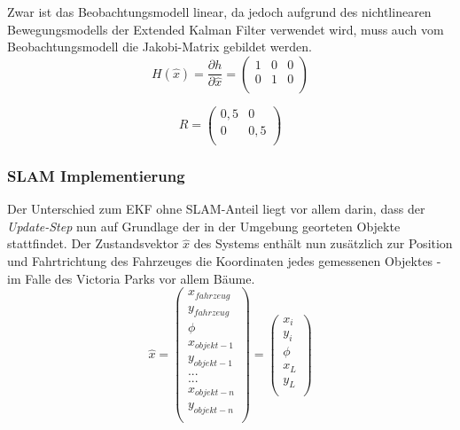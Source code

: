 \documentclass[11pt]{article}
\begin{document}
Zwar ist das Beobachtungsmodell linear, da jedoch aufgrund des nichtlinearen Bewegungsmodells der Extended Kalman Filter verwendet wird, muss auch vom Beobachtungsmodell die Jakobi-Matrix gebildet werden.
\begin{equation}\label{EKF-Observation-Model-Jakobi-Matrix}
	H(\hat{x})= \frac{\partial h}{\partial \hat{x}} = \begin{pmatrix}
		1 & 0 & 0 \\
		0 & 1 & 0 \\
	\end{pmatrix}
\end{equation}

\begin{equation}\label{GPS-Messungenauigkeits-Matrix}
	R = \begin{pmatrix}
		0,5 & 0 \\
		0 & 0,5 \\
	\end{pmatrix}
\end{equation}

\subsubsection{SLAM Implementierung}\label{SLAM Implementierung}
Der Unterschied zum EKF ohne SLAM-Anteil liegt vor allem darin, dass der \textit{Update-Step} nun auf Grundlage der in der Umgebung georteten Objekte stattfindet. Der Zustandsvektor $\hat{x}$ des Systems enthält nun zusätzlich zur Position und Fahrtrichtung des Fahrzeuges die Koordinaten jedes gemessenen Objektes - im Falle des Victoria Parks vor allem Bäume. 
\begin{equation}\label{SLAM-State-Vector}
	\hat{x} = \begin{pmatrix}
		x_{fahrzeug} \\
		y_{fahrzeug} \\
		\phi \\
		x_{objekt-1} \\
		y_{objekt-1} \\
		... \\
		... \\
		x_{objekt-n} \\
		y_{objekt-n} \\
	  \end{pmatrix} = \begin{pmatrix}
		  x_i \\
		  y_i \\
		  \phi \\
		  x_L \\
		  y_L \\
	  \end{pmatrix}
\end{equation}
\end{document}
